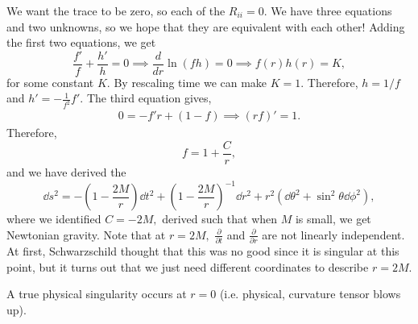 \documentclass{article}
\numberwithin{equation}{section}
\begin{document}
We want the trace to be zero, so each of the $R_{ii}=0.$ We have three equations and two unknowns, so we hope that they are equivalent with each other! Adding the first two equations, we get 
\begin{equation*}
    \frac{f'}{f} + \frac{h'}{h} = 0 \implies \frac{d}{dr} \ln(fh) = 0 \implies f(r)h(r) = K,
\end{equation*}
for some constant $K.$ By rescaling time we can make $K=1.$ Therefore, $h=1/f$ and $h' = -\frac{1}{f^2}f'.$ The third equation gives,
\begin{align*}
    0 = -f'r + (1-f) \implies (rf)' = 1.
\end{align*}
Therefore, 
\begin{equation*}
    f = 1 + \frac{C}{r},
\end{equation*}
and we have derived the 
\begin{equation}
    \dd{s}^2 = -\left(1 - \frac{2M}{r}\right) \dd{t}^2 + \left(1 - \frac{2M}{r}\right)^{-1}\dd{r}^2 + r^2 (\dd{\theta}^2 + \sin^2\theta \dd{\phi}^2),
\end{equation}
where we identified $C=-2M,$ derived such that when $M$ is small, we get Newtonian gravity. Note that at $r = 2M,$ $\frac{\partial}{\partial t}$ and $\frac{\partial}{\partial r}$ are not linearly independent. At first, Schwarzschild thought that this was no good since it is singular at this point, but it turns out that we just need different coordinates to describe $r=2M.$

A true physical singularity occurs at $r=0$ (i.e. physical, curvature tensor blows up).
\end{document}
